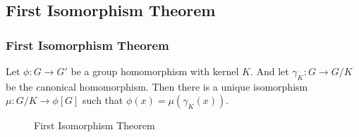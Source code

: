 \subsection{First Isomorphism Theorem}
\begin{frame}
	\frametitle{First Isomorphism Theorem}
	\begin{theorem}
		Let $\phi : G \to G'$ be a group homomorphism with kernel $K$.
		And let $\gamma_K : G \to G/K$ be the canonical homomorphism.
		Then there is a unique isomorphism $\mu : G/K \to \phi[G]$
		such that $\phi(x) = \mu(\gamma_K(x))$.
	\end{theorem}
	\begin{figure}
	\centering
	\caption{First Isomorphism Theorem}
\end{figure}
\end{frame}

